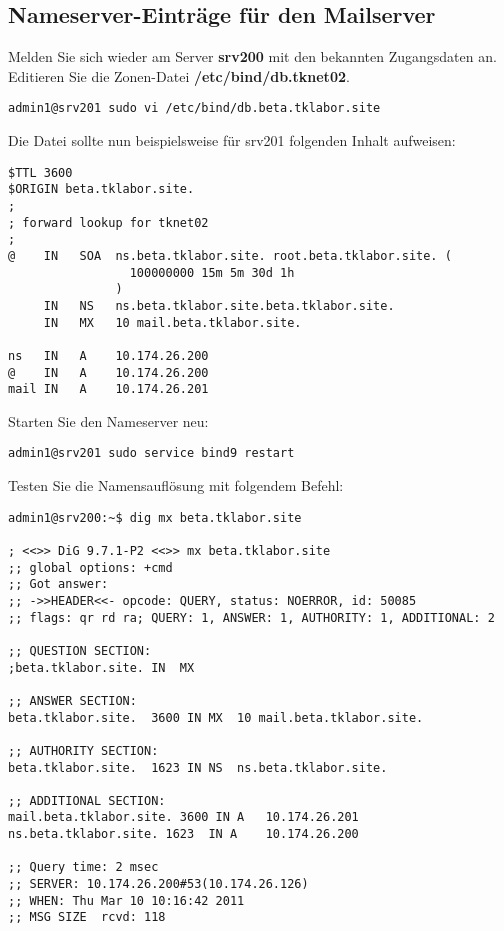 \subsection{Nameserver-Einträge für den Mailserver}
Melden Sie 
sich wieder am Server \textbf{srv200} mit den bekannten Zugangsdaten an. Editieren Sie die Zonen-Datei \textbf{/etc/bind/db.tknet02}.
\begin{lstlisting}
admin1@srv201 sudo vi /etc/bind/db.beta.tklabor.site
\end{lstlisting}
Die Datei sollte nun beispielsweise für srv201 folgenden Inhalt aufweisen:
\begin{scriptsize}
\begin{lstlisting}
$TTL 3600
$ORIGIN beta.tklabor.site.
;
; forward lookup for tknet02
;
@    IN   SOA  ns.beta.tklabor.site. root.beta.tklabor.site. ( 
                 100000000 15m 5m 30d 1h 
               )
     IN   NS   ns.beta.tklabor.site.beta.tklabor.site.
     IN   MX   10 mail.beta.tklabor.site.

ns   IN   A    10.174.26.200
@    IN   A    10.174.26.200
mail IN   A    10.174.26.201
\end{lstlisting}
\end{scriptsize}
Starten Sie den Nameserver neu:
\begin{lstlisting}
admin1@srv201 sudo service bind9 restart
\end{lstlisting}
Testen Sie die Namensauflösung mit folgendem Befehl:
\begin{scriptsize}
\begin{lstlisting}
admin1@srv200:~$ dig mx beta.tklabor.site

; <<>> DiG 9.7.1-P2 <<>> mx beta.tklabor.site
;; global options: +cmd
;; Got answer:
;; ->>HEADER<<- opcode: QUERY, status: NOERROR, id: 50085
;; flags: qr rd ra; QUERY: 1, ANSWER: 1, AUTHORITY: 1, ADDITIONAL: 2

;; QUESTION SECTION:
;beta.tklabor.site.	IN	MX

;; ANSWER SECTION:
beta.tklabor.site.	3600 IN	MX	10 mail.beta.tklabor.site.

;; AUTHORITY SECTION:
beta.tklabor.site.	1623 IN	NS	ns.beta.tklabor.site.

;; ADDITIONAL SECTION:
mail.beta.tklabor.site. 3600 IN A	10.174.26.201
ns.beta.tklabor.site. 1623	IN A	10.174.26.200

;; Query time: 2 msec
;; SERVER: 10.174.26.200#53(10.174.26.126)
;; WHEN: Thu Mar 10 10:16:42 2011
;; MSG SIZE  rcvd: 118
\end{lstlisting}
\end{scriptsize}

